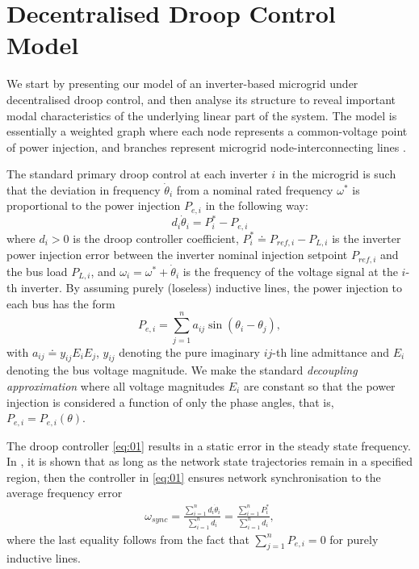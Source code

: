 \documentclass[letter, 10pt, conference]{ieeeconf}
\newcommand{\1}{\mathbf{1}}
\newcommand{\0}{\mathbf{0}}
\begin{document}
{\section{Decentralised Droop Control Model}
We start by presenting our model of an inverter-based microgrid under
decentralised droop control, and then analyse its structure to reveal
important modal characteristics of the underlying linear part of the
system.  The model is essentially a weighted graph where each node
represents a common-voltage point of power injection, and branches
represent microgrid node-interconnecting lines
\cite{JWSP-FD-FB:12u,AiG13a}.

The standard primary droop control at each inverter $i$ in the
microgrid is such that the deviation in frequency $\dot{\theta}_i$ from
a nominal rated frequency $\omega^*$ is proportional to the power
injection $P_{e,i}$ in the following way:
\begin{equation}
	\label{eq:01}
	d_i \dot{\theta}_i = P_i^* - P_{e,i}
\end{equation}
where $d_i>0$ is the droop controller coefficient, 
$P_i^* \doteq P_{ref,i}-P_{L,i}$ is the inverter power injection error between
the inverter nominal injection setpoint $P_{ref,i}$ and the bus load
$P_{L,i}$, and $\omega_i = \omega^* + \dot\theta_i$ is the frequency of 
the voltage signal at the $i$-th inverter.  By assuming purely (loseless)
inductive lines, the power injection to each bus has the form
\begin{equation}
	\label{eq:02}
	P_{e,i}=\sum_{j=1}^{n} a_{ij} \sin(\theta_i-\theta_j),
\end{equation}
with $a_{ij} \doteq y_{ij} E_i E_j$, $y_{ij}$ denoting the pure
imaginary $ij$-th line admittance and $E_i$ denoting the bus voltage
magnitude. We make the standard \emph{decoupling approximation}
\cite{ZhH13} where all voltage magnitudes $E_i$ are constant so that
the power injection is considered a function of only the phase angles,
that is, $P_{e,i} =P_{e,i}(\theta)$. 


The droop controller \eqref{eq:01} results in a static error in the steady
state frequency.  In \cite{AiG13a}, it is shown that as long as the
network state trajectories remain in a specified region, then the
controller in \eqref{eq:01} ensures network synchronisation to the
average frequency error
\begin{align}
	\label{eq:wsync1}
	\omega_{sync}=
		\frac{\sum_{i=1}^n d_i \dot{\theta}_i}{\sum_{i=1}^n d_i}
		= \frac{\sum_{i=1}^n P_i^* }{\sum_{i=1}^n d_i},
\end{align}
where the last equality follows from the fact that $\sum_{j=1}^{n}
P_{e,i} = 0$ for purely inductive lines.

}
\end{document}
